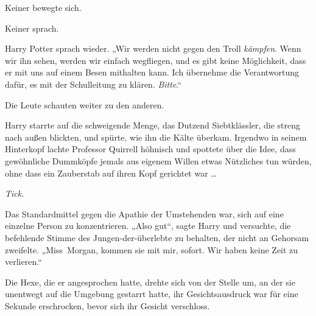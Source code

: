 Keiner bewegte sich.

Keiner sprach.

Harry Potter sprach wieder.
„Wir werden nicht gegen den Troll \emph{kämpfen}. Wenn wir ihn sehen, werden wir einfach wegfliegen, und es gibt keine Möglichkeit, dass er mit uns auf einem Besen mithalten kann. Ich übernehme die Verantwortung dafür, es mit der Schulleitung zu klären. \emph{Bitte}.“

Die Leute schauten weiter zu den anderen.

\later

Harry starrte auf die schweigende Menge, das Dutzend Siebtklässler, die streng nach außen blickten, und spürte, wie ihn die Kälte überkam. Irgendwo in seinem Hinterkopf lachte Professor Quirrell höhnisch und spottete über die Idee, dass gewöhnliche Dummköpfe jemals aus eigenem Willen etwas Nützliches tun würden, ohne dass ein Zauberstab auf ihren Kopf gerichtet war …

\emph{Tick.}

Das Standardmittel gegen die Apathie der Umstehenden war, sich auf eine einzelne Person zu konzentrieren.
„Also gut“, sagte Harry und versuchte, die befehlende Stimme des Jungen-der-überlebte zu behalten, der nicht an Gehorsam zweifelte.
„Miss~Morgan, kommen sie mit mir, sofort. Wir haben keine Zeit zu verlieren.“

Die Hexe, die er angesprochen hatte, drehte sich von der Stelle um, an der sie unentwegt auf die Umgebung gestarrt hatte, ihr Gesichtsausdruck war für eine Sekunde erschrocken, bevor sich ihr Gesicht verschloss.


